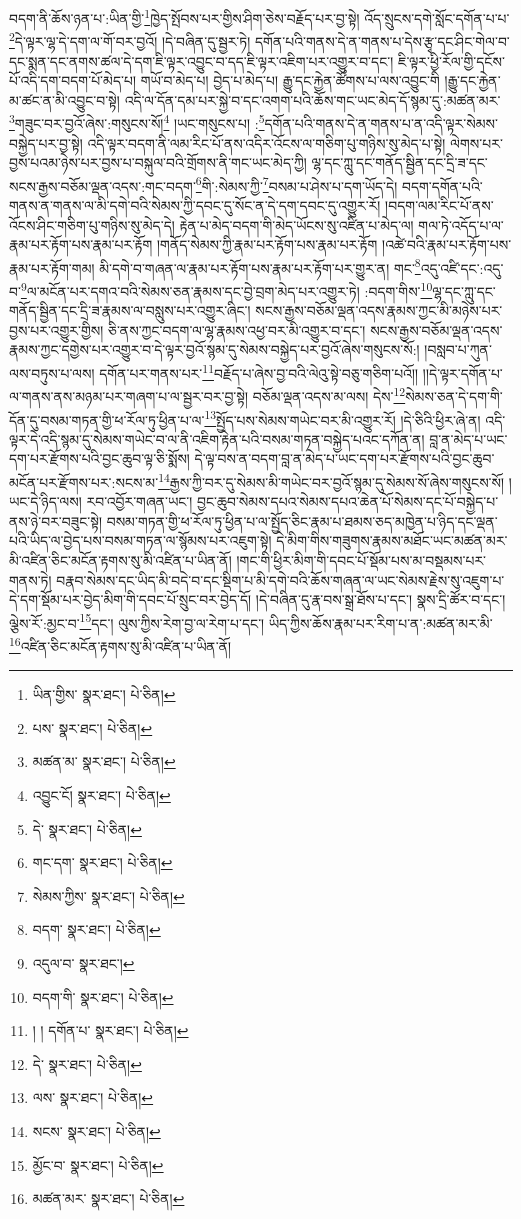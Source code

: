 བདག་ནི་ཆོས་ཉན་པ་:ཡིན་གྱི་\footnote{ཡིན་གྱིས་  སྣར་ཐང་།  པེ་ཅིན། }ཁྱེད་སྤོབས་པར་གྱིས་ཤིག་ཅེས་བརྗོད་པར་བྱ་སྟེ། འོད་སྲུངས་དགེ་སློང་དགོན་པ་པ་\footnote{པས་  སྣར་ཐང་།  པེ་ཅིན། }དེ་ལྟར་ལྷ་དེ་དག་ལ་གོ་བར་བྱའོ། །དེ་བཞིན་དུ་སྦྱར་ཏེ། དགོན་པའི་གནས་དེ་ན་གནས་པ་དེས་རྩྭ་དང་ཤིང་གེལ་བ་དང་སྨན་དང་ནགས་ཚལ་དེ་དག་ཇི་ལྟར་འབྱུང་བ་དད་ཇི་ལྟར་འཇིག་པར་འགྱུར་བ་དང་། ཇི་ལྟར་ཕྱི་རོལ་གྱི་དངོས་པོ་འདི་དག་བདག་པོ་མེད་པ། གཡོ་བ་མེད་པ། བྱེད་པ་མེད་པ། རྒྱུ་དང་རྐྱེན་ཚོགས་པ་ལས་འབྱུང་གི །རྒྱུ་དང་རྐྱེན་མ་ཚང་ན་མི་འབྱུང་བ་སྟེ། འདི་ལ་དོན་དམ་པར་སྐྱེ་བ་དང་འགག་པའི་ཆོས་གང་ཡང་མེད་དོ་སྙམ་དུ་:མཚན་མར་\footnote{མཚན་མ་  སྣར་ཐང་།  པེ་ཅིན། }གཟུང་བར་བྱའོ་ཞེས་:གསུངས་སོ།\footnote{འབྱུང་ངོ།  སྣར་ཐང་།  པེ་ཅིན། } །ཡང་གསུངས་པ། :\footnote{དེ་  སྣར་ཐང་།  པེ་ཅིན། }དགོན་པའི་གནས་དེ་ན་གནས་པ་ན་འདི་ལྟར་སེམས་བསྐྱེད་པར་བྱ་སྟེ། འདི་ལྟར་བདག་ནི་ལམ་རིང་པོ་ནས་འདིར་འོངས་ལ་གཅིག་པུ་གཉིས་སུ་མེད་པ་སྟེ། ལེགས་པར་བྱས་པའམ་ཉེས་པར་བྱས་པ་བསྐུལ་བའི་གྲོགས་ནི་གང་ཡང་མེད་ཀྱི། ལྷ་དང་ཀླུ་དང་གནོད་སྦྱིན་དང་དྲི་ཟ་དང་སངས་རྒྱས་བཅོམ་ལྡན་འདས་:གང་བདག་\footnote{གང་དག་  སྣར་ཐང་།  པེ་ཅིན། }གི་:སེམས་ཀྱི་\footnote{སེམས་ཀྱིས་  སྣར་ཐང་།  པེ་ཅིན། }བསམ་པ་ཤེས་པ་དག་ཡོད་དེ། བདག་དགོན་པའི་གནས་ན་གནས་ལ་མི་དགེ་བའི་སེམས་ཀྱི་དབང་དུ་སོང་ན་དེ་དག་དབང་དུ་འགྱུར་རོ། །བདག་ལམ་རིང་པོ་ནས་འོངས་ཤིང་གཅིག་པུ་གཉིས་སུ་མེད་དེ། རྟེན་པ་མེད་བདག་གི་མེད་ཡོངས་སུ་འཛིན་པ་མེད་ལ། གལ་ཏེ་འདོད་པ་ལ་རྣམ་པར་རྟོག་པས་རྣམ་པར་རྟོག །གནོད་སེམས་ཀྱི་རྣམ་པར་རྟོག་པས་རྣམ་པར་རྟོག །འཚེ་བའི་རྣམ་པར་རྟོག་པས་རྣམ་པར་རྟོག་གམ། མི་དགེ་བ་གཞན་ལ་རྣམ་པར་རྟོག་པས་རྣམ་པར་རྟོག་པར་གྱུར་ན། གང་\footnote{བདག་  སྣར་ཐང་།  པེ་ཅིན། }འདུ་འཛི་དང་:འདུ་བ་\footnote{འདུལ་བ་  སྣར་ཐང་། }ལ་མངོན་པར་དགའ་བའི་སེམས་ཅན་རྣམས་དང་བྱེ་བྲག་མེད་པར་འགྱུར་ཏེ། :བདག་གིས་\footnote{བདག་གི་  སྣར་ཐང་།  པེ་ཅིན། }ལྷ་དང་ཀླུ་དང་གནོད་སྦྱིན་དང་དྲི་ཟ་རྣམས་ལ་བསླུས་པར་འགྱུར་ཞིང་། སངས་རྒྱས་བཅོམ་ལྡན་འདས་རྣམས་ཀྱང་མི་མཉེས་པར་བྱས་པར་འགྱུར་གྱིས། ཅི་ནས་ཀྱང་བདག་ལ་ལྷ་རྣམས་འཕྱ་བར་མི་འགྱུར་བ་དང་། སངས་རྒྱས་བཅོམ་ལྡན་འདས་རྣམས་ཀྱང་དགྱེས་པར་འགྱུར་བ་དེ་ལྟར་བྱའོ་སྙམ་དུ་སེམས་བསྐྱེད་པར་བྱའོ་ཞེས་གསུངས་སོ:། །བསླབ་པ་ཀུན་ལས་བཏུས་པ་ལས། དགོན་པར་གནས་པར་\footnote{། ། དགོན་པ་  སྣར་ཐང་།  པེ་ཅིན། }བརྗོད་པ་ཞེས་བྱ་བའི་ལེའུ་སྟེ་བཅུ་གཅིག་པའོ།། །།དེ་ལྟར་དགོན་པ་ལ་གནས་ནས་མཉམ་པར་གཞག་པ་ལ་སྦྱར་བར་བྱ་སྟེ། བཅོམ་ལྡན་འདས་མ་ལས། དེས་\footnote{དེ་  སྣར་ཐང་།  པེ་ཅིན། }སེམས་ཅན་དེ་དག་གི་དོན་དུ་བསམ་གཏན་གྱི་ཕ་རོལ་ཏུ་ཕྱིན་པ་ལ་\footnote{ལས་  སྣར་ཐང་།  པེ་ཅིན། }སྤྱོད་པས་སེམས་གཡེང་བར་མི་འགྱུར་རོ། །དེ་ཅིའི་ཕྱིར་ཞེ་ན། འདི་ལྟར་དེ་འདི་སྙམ་དུ་སེམས་གཡེང་བ་ལ་ནི་འཇིག་རྟེན་པའི་བསམ་གཏན་བསྐྱེད་པའང་དཀོན་ན། བླ་ན་མེད་པ་ཡང་དག་པར་རྫོགས་པའི་བྱང་ཆུབ་ལྟ་ཅི་སྨོས། དེ་ལྟ་བས་ན་བདག་བླ་ན་མེད་པ་ཡང་དག་པར་རྫོགས་པའི་བྱང་ཆུབ་མངོན་པར་རྫོགས་པར་:སངས་མ་\footnote{སངས་  སྣར་ཐང་།  པེ་ཅིན། }རྒྱས་ཀྱི་བར་དུ་སེམས་མི་གཡེང་བར་བྱའོ་སྙམ་དུ་སེམས་སོ་ཞེས་གསུངས་སོ། །ཡང་དེ་ཉིད་ལས། རབ་འབྱོར་གཞན་ཡང་། བྱང་ཆུབ་སེམས་དཔའ་སེམས་དཔའ་ཆེན་པོ་སེམས་དང་པོ་བསྐྱེད་པ་ནས་ཉེ་བར་བཟུང་སྟེ། བསམ་གཏན་གྱི་ཕ་རོལ་ཏུ་ཕྱིན་པ་ལ་སྤྱོད་ཅིང་རྣམ་པ་ཐམས་ཅད་མཁྱེན་པ་ཉིད་དང་ལྡན་པའི་ཡིད་ལ་བྱེད་པས་བསམ་གཏན་ལ་སྙོམས་པར་འཇུག་སྟེ། དེ་མིག་གིས་གཟུགས་རྣམས་མཐོང་ཡང་མཚན་མར་མི་འཛིན་ཅིང་མངོན་རྟགས་སུ་མི་འཛིན་པ་ཡིན་ནོ། །གང་གི་ཕྱིར་མིག་གི་དབང་པོ་སྡོམ་པས་མ་བསྡམས་པར་གནས་ཏེ། བརྣབ་སེམས་དང་ཡིད་མི་བདེ་བ་དང་སྡིག་པ་མི་དགེ་བའི་ཆོས་གཞན་ལ་ཡང་སེམས་རྗེས་སུ་འཇུག་པ་དེ་དག་སྡོམ་པར་བྱེད་མིག་གི་དབང་པོ་སྲུང་བར་བྱེད་དོ། །དེ་བཞིན་དུ་རྣ་བས་སྒྲ་ཐོས་པ་དང་། སྣས་དྲི་ཚོར་བ་དང་། ལྕེས་རོ་:མྱང་བ་\footnote{མྱོང་བ་  སྣར་ཐང་།  པེ་ཅིན། }དང་། ལུས་ཀྱིས་རེག་བྱ་ལ་རེག་པ་དང་། ཡིད་ཀྱིས་ཆོས་རྣམ་པར་རིག་པ་ན་:མཚན་མར་མི་\footnote{མཚན་མར་  སྣར་ཐང་།  པེ་ཅིན། }འཛིན་ཅིང་མངོན་རྟགས་སུ་མི་འཛིན་པ་ཡིན་ནོ། 